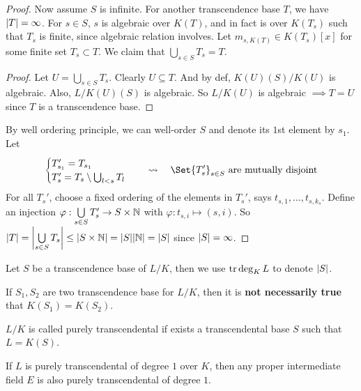 \begin{theorem}
\begin{proof}
    Now assume $S$ is infinite.
    For another transcendence base $T$, we have $\abs{T} = \infty$.
    For $s \in S$, $s$ is algebraic over $K(T)$, and
    in fact is over $K(T_s)$ such that $T_s$ is finite,
    since algebraic relation involves.
    Let $m_{s, K(T)} \in K(T_s)[x]$ for some finite set $T_s \subset T$.
    We claim that $\bigcup\limits_{s\in S} T_s = T$.
    \begin{proof}
      Let $U = \bigcup\limits_{s\in S} T_s$.
      Clearly $U \subseteq T$. And by def, $K(U)(S)/K(U)$ is algebraic.
      Also, $L/K(U)(S)$ is algebraic. So $L/K(U)$ is algebraic
      $\implies T = U$ since $T$ is a transcendence base.
    \end{proof}
    By well ordering principle, we can well-order $S$ and denote its
    $1$st element by $s_1$.
    Let
    \[
      \begin{cases}
        T_{s_1}' = T_{s_1} \\
        T_{s}' = T_s \setminus \bigcup_{l < s} T_l
      \end{cases}
      \quad \leadsto \quad
      \Set{ T_s' }_{s\in S} \text{~are mutually disjoint}
    \]
    For all $T_s'$, choose a fixed ordering of the elements in $T_s'$, says
    $t_{s,1}, \dots, t_{s, {k_s}}$. Define an injection
    $\varphi: \bigcup\limits_{s\in S} T_s' \to S\times \Nb$ with
    $\varphi: t_{s,i} \mapsto (s, i)$.
    So $\abs{T} = \abs*{\bigcup\limits_{s\in S} T_s} \le \abs{S\times \Nb}
    = \abs{S}\abs{\Nb} = \abs{S}$ since $\abs{S} = \infty$.
  \end{proof}
\end{theorem}

\begin{definition}
  Let $S$ be a transcendence base of $L/K$, then we use
  $\trdeg_K L$ to denote $\abs{S}$.
\end{definition}

\begin{remark}
  If $S_1, S_2$ are two transcendence base for $L/K$, then it is {\bf not
  necessarily true} that $K(S_1) = K(S_2)$.
\end{remark}

\begin{definition}
  $L/K$ is called purely transcendental if exists a transcendental base $S$
  such that $L = K(S)$.
\end{definition}

\begin{theorem}
  If $L$ is purely transcendental of degree $1$ over $K$, then any proper
  intermediate field $E$ is also purely transcendental of degree $1$.
\end{theorem}

